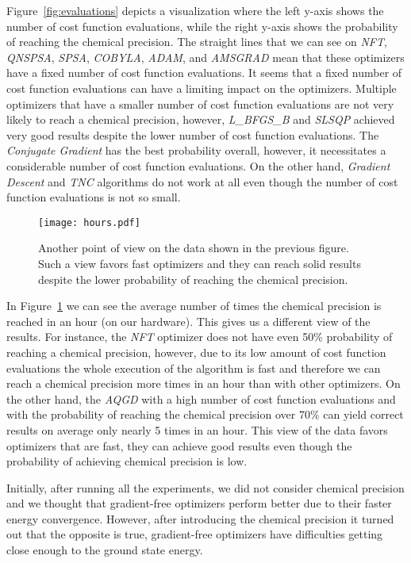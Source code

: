 Figure~\ref{fig:evaluations} depicts a visualization where the left y-axis shows the number of cost function evaluations, while the right y-axis shows the probability of reaching the chemical precision. The straight lines that we can see on \textit{NFT}, \textit{QNSPSA}, \textit{SPSA}, \textit{COBYLA}, \textit{ADAM}, and \textit{AMSGRAD} mean that these optimizers have a fixed number of cost function evaluations. It seems that a fixed number of cost function evaluations can have a limiting impact on the optimizers. Multiple optimizers that have a smaller number of cost function evaluations are not very likely to reach a chemical precision, however, \textit{L\_BFGS\_B} and \textit{SLSQP} achieved very good results despite the lower number of cost function evaluations. The \textit{Conjugate Gradient} has the best probability overall, however, it necessitates a considerable number of cost function evaluations. On the other hand, \textit{Gradient Descent} and \textit{TNC} algorithms do not work at all even though the number of cost function evaluations is not so small.

\begin{figure}[H]
    \centering
    \texttt{[image: hours.pdf]}
    \caption{Another point of view on the data shown in the previous figure. Such a view favors fast optimizers and they can reach solid results despite the lower probability of reaching the chemical precision.}
    \label{fig:hours}
\end{figure}

In Figure~\ref{fig:hours} we can see the average number of times the chemical precision is reached in an hour (on our hardware). This gives us a different view of the results. For instance, the \textit{NFT} optimizer does not have even 50\% probability of reaching a chemical precision, however, due to its low amount of cost function evaluations the whole execution of the algorithm is fast and therefore we can reach a chemical precision more times in an hour than with other optimizers. On the other hand, the \textit{AQGD} with a high number of cost function evaluations and with the probability of reaching the chemical precision over 70\% can yield correct results on average only nearly 5 times in an hour. This view of the data favors optimizers that are fast, they can achieve good results even though the probability of achieving chemical precision is low.

Initially, after running all the experiments, we did not consider chemical precision and we thought that gradient-free optimizers perform better due to their faster energy convergence. However, after introducing the chemical precision it turned out that the opposite is true, gradient-free optimizers have difficulties getting close enough to the ground state energy.


